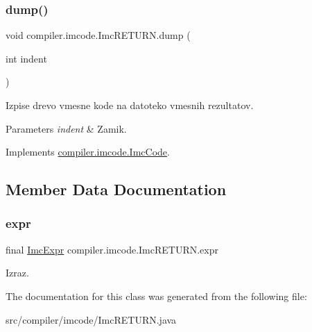 \subsubsection{\texorpdfstring{dump()}{dump()}}
{\footnotesize\ttfamily void compiler.\+imcode.\+Imc\+R\+E\+T\+U\+R\+N.\+dump (\begin{DoxyParamCaption}\item[{int}]{indent }\end{DoxyParamCaption})}

Izpise drevo vmesne kode na datoteko vmesnih rezultatov.


\begin{DoxyParams}{Parameters}
{\em indent} & Zamik. \\
\hline
\end{DoxyParams}


Implements \hyperlink{interfacecompiler_1_1imcode_1_1_imc_code_a26451dea2ab4dbd7054ac33f4c6d71fe}{compiler.\+imcode.\+Imc\+Code}.



\subsection{Member Data Documentation}
\mbox{\label{classcompiler_1_1imcode_1_1_imc_r_e_t_u_r_n_a952c6353103f0816a8c45669492349c7}} 
\subsubsection{\texorpdfstring{expr}{expr}}
{\footnotesize\ttfamily final \hyperlink{classcompiler_1_1imcode_1_1_imc_expr}{Imc\+Expr} compiler.\+imcode.\+Imc\+R\+E\+T\+U\+R\+N.\+expr}

Izraz. 

The documentation for this class was generated from the following file\+:\begin{DoxyCompactItemize}
\item 
src/compiler/imcode/Imc\+R\+E\+T\+U\+R\+N.\+java\end{DoxyCompactItemize}
